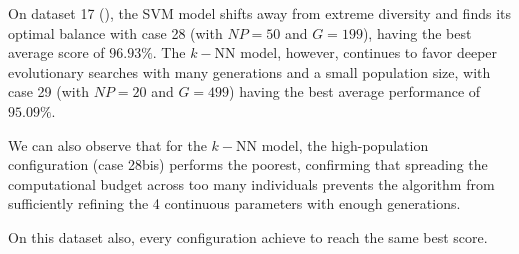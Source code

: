 \documentclass[12pt, openany]{article}
\begin{document}
On dataset 17 (), the SVM model shifts away from extreme diversity and finds its optimal balance with case 28 (with $NP=50$ and $G=199$), having the best average score of $96.93\%$. The $k-$NN model, however, continues to favor deeper evolutionary searches with many generations and a small population size, with case 29 (with $NP=20$ and $G=499$) having the best average performance of $95.09\%$.

We can also observe that for the $k-$NN model, the high-population configuration (case 28bis) performs the poorest, confirming that spreading the computational budget across too many individuals prevents the algorithm from sufficiently refining the 4 continuous parameters with enough generations.

On this dataset also, every configuration achieve to reach the same best score.
\end{document}
